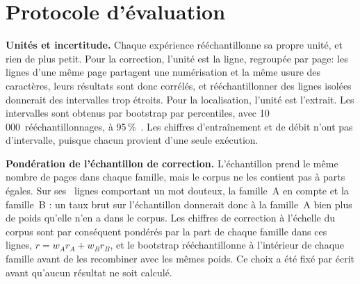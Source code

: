\section{Protocole d'évaluation}
\label{sec:protocol}

\textbf{Unités et incertitude.} Chaque expérience rééchantillonne sa propre
unité, et rien de plus petit. Pour la correction, l'unité est la ligne,
regroupée par page: les lignes d'une même page partagent une numérisation et
la même usure des caractères, leurs résultats sont donc corrélés, et
rééchantillonner des lignes isolées donnerait des intervalles trop étroits.
Pour la localisation, l'unité est l'extrait. Les intervalles sont obtenus par
bootstrap par percentiles, avec 10\,000~rééchantillonnages, à
95\,\%~\cite{efron1994bootstrap}. Les chiffres d'entraînement et de débit n'ont
pas d'intervalle, puisque chacun provient d'une seule exécution.

\textbf{Pondération de l'échantillon de correction.} L'échantillon prend le
même nombre de pages dans chaque famille, mais le corpus ne les contient pas à
parts égales. Sur ses \corrReachLinesWithSpan{}~lignes comportant un mot
douteux, la famille~A en compte \corrReachLinesWithSpanFamilyA{} et la
famille~B \corrReachLinesWithSpanFamilyB{}: un taux brut sur l'échantillon
donnerait donc à la famille~A bien plus de poids qu'elle n'en a dans le corpus.
Les chiffres de correction à l'échelle du corpus sont par conséquent pondérés
par la part de chaque famille dans ces lignes, $r = w_A r_A + w_B r_B$, et le
bootstrap rééchantillonne à l'intérieur de chaque famille avant de les
recombiner avec les mêmes poids. Ce choix a été fixé par écrit avant qu'aucun
résultat ne soit calculé.

